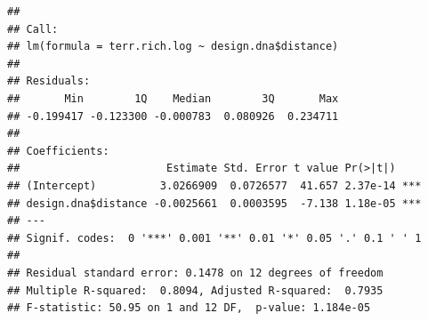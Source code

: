 \documentclass[]{article}
\newenvironment{Shaded}{\begin{snugshade}}{\end{snugshade}}
\newcommand{\DecValTok}[1]{\textcolor[rgb]{0.00,0.00,0.81}{#1}}
\newcommand{\KeywordTok}[1]{\textcolor[rgb]{0.13,0.29,0.53}{\textbf{#1}}}
\newcommand{\NormalTok}[1]{#1}
\newcommand{\OperatorTok}[1]{\textcolor[rgb]{0.81,0.36,0.00}{\textbf{#1}}}
\newcommand{\StringTok}[1]{\textcolor[rgb]{0.31,0.60,0.02}{#1}}
\begin{document}
\begin{verbatim}
## 
## Call:
## lm(formula = terr.rich.log ~ design.dna$distance)
## 
## Residuals:
##       Min        1Q    Median        3Q       Max 
## -0.199417 -0.123300 -0.000783  0.080926  0.234711 
## 
## Coefficients:
##                       Estimate Std. Error t value Pr(>|t|)    
## (Intercept)          3.0266909  0.0726577  41.657 2.37e-14 ***
## design.dna$distance -0.0025661  0.0003595  -7.138 1.18e-05 ***
## ---
## Signif. codes:  0 '***' 0.001 '**' 0.01 '*' 0.05 '.' 0.1 ' ' 1
## 
## Residual standard error: 0.1478 on 12 degrees of freedom
## Multiple R-squared:  0.8094, Adjusted R-squared:  0.7935 
## F-statistic: 50.95 on 1 and 12 DF,  p-value: 1.184e-05
\end{verbatim}

\begin{Shaded}
\end{Shaded}
\end{document}
